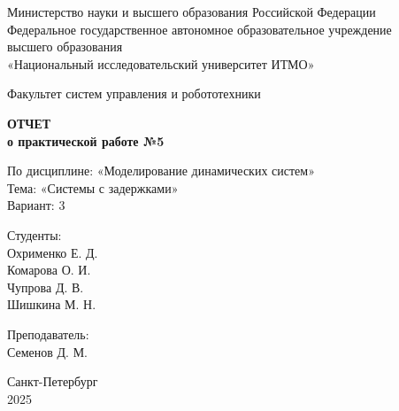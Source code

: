 \documentclass[a4paper,12pt]{article}
\begin{document}
	
	\begin{titlepage}
		\centering
		\vspace*{1cm}
		
		{\small
			Министерство науки и высшего образования Российской Федерации\\
			Федеральное государственное автономное образовательное учреждение\\
			высшего образования\\
			«Национальный исследовательский университет ИТМО»\\
		}
		
		\vspace{2cm}
		
		{\large
			Факультет систем управления и робототехники\\
		}
		
		\vspace{3cm}
		
		{\Huge\bfseries
			ОТЧЕТ\\
		}
		\vspace{0.5cm}
		{\LARGE\bfseries
			о практической работе №5\\
		}
		
		\vspace{1cm}
		
		{\Large
			По дисциплине: «Моделирование динамических систем»\\
			\vspace{0.5cm}
			Тема: «Системы с задержками»\\
			\vspace{0.5cm}
			Вариант: 3\\
		}
		
		\vspace{3cm}
		
		\begin{minipage}{0.4\textwidth}
			\raggedright
			{\large
				Студенты:\\
			}
			Охрименко Е. Д.\\
			Комарова О. И.\\
			Чупрова Д. В.\\
			Шишкина М. Н.
		\end{minipage}
		\hfill
		\begin{minipage}{0.4\textwidth}
			\raggedleft
			{\large
				Преподаватель:\\
			}
			Семенов Д. М.\\
		\end{minipage}
		
		\vfill
		
		{\large
			Санкт-Петербург\\
			2025\\
		}
		
	\end{titlepage}
	
\end{document}
